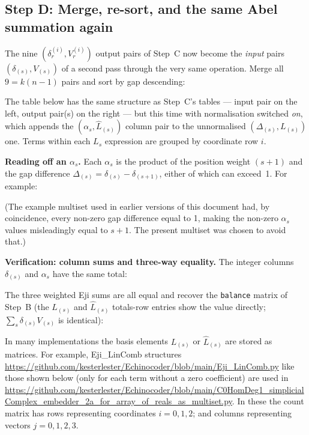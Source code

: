\subsection*{Step D: Merge, re-sort, and the same Abel summation again}

The nine $(\delta^{(i)}_r, V^{(i)}_r)$ output pairs of Step~C now become the
\emph{input} pairs $(\delta_{(s)}, V_{(s)})$ of a second pass through the very
same operation.  Merge all $9 = k(n{-}1)$ pairs and sort by gap descending:

The table below has the same structure as Step~C's tables — input pair on the
left, output pair(s) on the right — but this time with normalisation switched
\emph{on}, which appends the $(\alpha_s, \hat{L}_{(s)})$ column pair to the
unnormalised $(\Delta_{(s)}, L_{(s)})$ one.  Terms within each $L_s$
expression are grouped by coordinate row $i$.




\begin{tcolorbox}[notebox]
\textbf{Reading off an $\alpha_s$.}  Each $\alpha_s$ is the product of the
position weight $(s{+}1)$ and the gap difference
$\Delta_{(s)} = \delta_{(s)}-\delta_{(s+1)}$, either of which can exceed~1.
For example:

(The example multiset used in earlier versions of this document had, by
coincidence, every non-zero gap difference equal to 1, making the non-zero
$\alpha_s$ values misleadingly equal to $s{+}1$.  The present multiset was
chosen to avoid that.)
\end{tcolorbox}

\begin{tcolorbox}[notebox]
\textbf{Verification: column sums and three-way equality.}
The integer columns $\delta_{(s)}$ and $\alpha_s$ have the same total:

The three weighted Eji sums are all equal and recover the
\texttt{balance} matrix of Step~B (the $L_{(s)}$ and ${\hat L}_{(s)}$ totals-row
entries show the value directly; $\sum_s\delta_{(s)}V_{(s)}$ is identical):

\end{tcolorbox}

In many implementations the basis elements $L_{(s)}$ or ${\hat L}_{(s)}$ are stored as matrices.   For example, Eji\_LinComb
structures \url{https://github.com/kesterlester/Echinocoder/blob/main/Eji_LinComb.py} like those shown
below (only for each term without a zero coefficient) are used in
\url{https://github.com/kesterlester/Echinocoder/blob/main/C0HomDeg1_simplicialComplex_embedder_2a_for_array_of_reals_as_multiset.py}.
In these the count matrix has rows representing
coordinates $i{=}0,1,2$; and columns representing vectors $j{=}0,1,2,3$.


